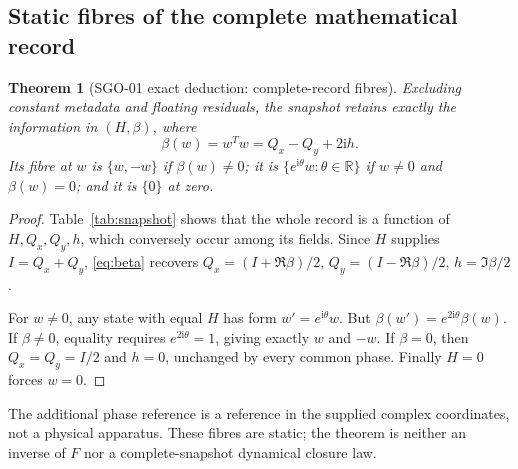\documentclass[11pt,a4paper]{article}
\newtheorem{theorem}[proposition]{Theorem}
\newcommand{\R}{\mathbb R}\newcommand{\C}{\mathbb C}
\newcommand{\ii}{\mathrm i}\newcommand{\tr}{\operatorname{tr}}
\begin{document}
\subsection{Static fibres of the complete mathematical record}
\begin{theorem}[SGO-01 exact deduction: complete-record fibres]\label{thm:snapshot}
Excluding constant metadata and floating residuals, the snapshot retains exactly the information in $(H,\beta)$, where
\begin{equation}
\beta(w)=w^Tw=Q_x-Q_y+2\ii h.\label{eq:beta}
\end{equation}
Its fibre at $w$ is $\{w,-w\}$ if $\beta(w)\ne0$; it is $\{e^{\ii\theta}w:\theta\in\R\}$ if $w\ne0$ and $\beta(w)=0$; and it is $\{0\}$ at zero.
\end{theorem}
\begin{proof}
Table~\ref{tab:snapshot} shows that the whole record is a function of $H,Q_x,Q_y,h$, which conversely occur among its fields. Since $H$ supplies $I=Q_x+Q_y$, \eqref{eq:beta} recovers $Q_x=(I+\Re\beta)/2$, $Q_y=(I-\Re\beta)/2$, $h=\Im\beta/2$.

For $w\ne0$, any state with equal $H$ has form $w'=e^{\ii\theta}w$. But $\beta(w')=e^{2\ii\theta}\beta(w)$. If $\beta\ne0$, equality requires $e^{2\ii\theta}=1$, giving exactly $w$ and $-w$. If $\beta=0$, then $Q_x=Q_y=I/2$ and $h=0$, unchanged by every common phase. Finally $H=0$ forces $w=0$.
\end{proof}
The additional phase reference is a reference in the supplied complex coordinates, not a physical apparatus. These fibres are static; the theorem is neither an inverse of $F$ nor a complete-snapshot dynamical closure law.
\end{document}
